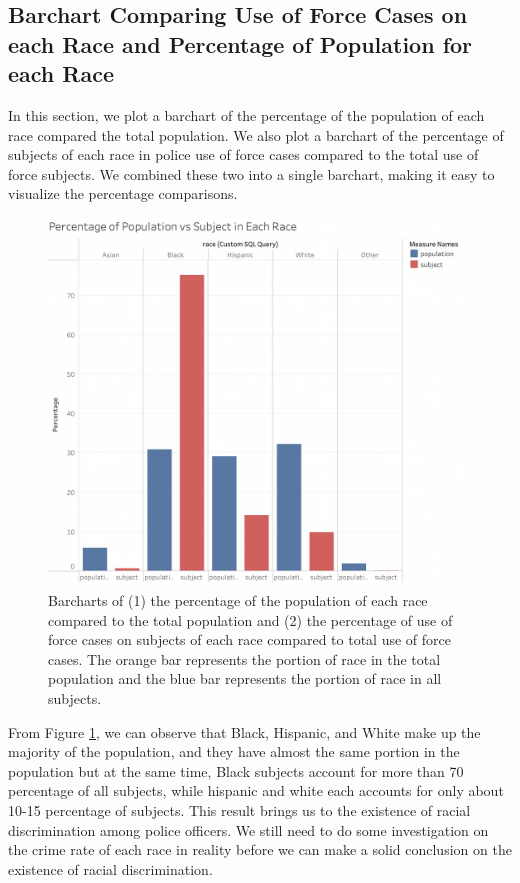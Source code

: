 \documentclass[10pt]{article}
\begin{document}
\subsection{Barchart Comparing Use of Force Cases on each Race and Percentage of Population for each Race}

In this section, we plot a barchart of the percentage of the population of each race compared the total population. We also plot a barchart of the percentage of subjects of each race in police use of force cases compared to the total use of force subjects. We combined these two into a single barchart, making it easy to visualize the percentage comparisons.

\begin{figure}[h]
\centering
\includegraphics[scale=0.44]{image5.png}
\caption{Barcharts of (1) the percentage of the population of each race compared to the total population and (2) the percentage of use of force cases on subjects of each race compared to total use of force cases. The orange bar represents the portion of race in the total population and the blue bar represents the portion of race in all subjects.}
\label{fig:population}
\end{figure}


From Figure \ref{fig:population}, we can observe that Black, Hispanic, and White make up the majority of the population, and they have almost the same portion in the population but at the same time, Black subjects account for more than 70 percentage of all subjects, while hispanic and white each accounts for only about 10-15 percentage of subjects. This result brings us to the existence of racial discrimination among police officers. We still need to do some investigation on the crime rate of each race in reality before we can make a solid conclusion on the existence of racial discrimination.
\end{document}
